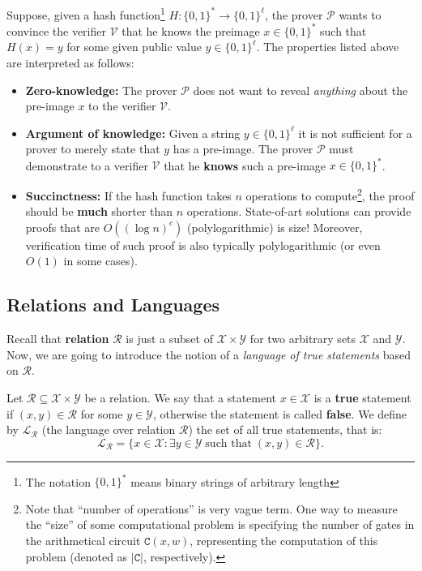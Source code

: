 \documentclass[../lecture-notes-148x210.tex]{subfiles}
\begin{document}
\begin{example}
    Suppose, given a hash function\footnote{The notation $\{0,1\}^*$ means binary strings of arbitrary length} $H: \{0,1\}^* \to \{0,1\}^{\ell}$, the prover $\mathcal{P}$ wants to convince the verifier $\mathcal{V}$ that he knows the preimage $x \in \{0,1\}^*$ such that $H(x) = y$ for some given public value $y \in \{0,1\}^{\ell}$. The properties listed above are interpreted as follows:
    \begin{itemize}
        \item \textbf{Zero-knowledge:} The prover $\mathcal{P}$ does not want to reveal \textit{anything} about the pre-image $x$ to the verifier $\mathcal{V}$.
        \item \textbf{Argument of knowledge:} Given a string $y \in \{0,1\}^{\ell}$ it is not sufficient for a prover to merely state that $y$ has a pre-image. The prover $\mathcal{P}$ must demonstrate to a verifier $\mathcal{V}$ that he \textbf{knows} such a pre-image $x \in \{0,1\}^*$.
        \item \textbf{Succinctness:} If the hash function takes $n$ operations to compute\footnote{Note that ``number of operations'' is very vague term. One way to measure the ``size'' of some computational problem is specifying the number of gates in the arithmetical circuit $\mathtt{C}(x,w)$, representing the computation of this problem (denoted as $|\mathtt{C}|$, respectively).}, the proof should be \textbf{much} shorter than $n$ operations. State-of-art solutions can provide proofs that are $O((\log n)^c)$ (polylogarithmic) is size! Moreover, verification time of such proof is also typically polylogarithmic (or even $O(1)$ in some cases).
    \end{itemize}
\end{example}

\subsection{Relations and Languages}\label{section:relations_and_languages}
Recall that \textbf{relation} $\mathcal{R}$ is just a subset of $\mathcal{X} \times \mathcal{Y}$ for two arbitrary sets $\mathcal{X}$ and $\mathcal{Y}$. Now, we are going to introduce the notion of a \emph{language of true statements} based on $\mathcal{R}$.

\begin{definition}
    Let $\mathcal{R} \subseteq \mathcal{X} \times \mathcal{Y}$ be a relation. We say that a statement $x \in \mathcal{X}$ is a \textbf{true} statement if $(x,y) \in \mathcal{R}$ for some $y \in \mathcal{Y}$, otherwise the statement is called \textbf{false}. We define by $\mathcal{L}_{\mathcal{R}}$ (the language over relation $\mathcal{R}$) the set of all true statements, that is:
    \begin{equation*}
        \mathcal{L}_{\mathcal{R}} = \{ x \in \mathcal{X}: \exists y \in \mathcal{Y} \; \text{such that} \; (x,y) \in \mathcal{R} \}.
    \end{equation*}
\end{definition}
\end{document}

